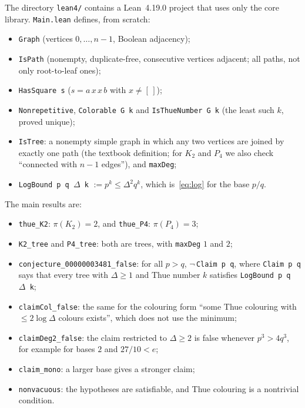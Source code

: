 \documentclass[11pt]{article}
\theoremstyle{definition}
\theoremstyle{remark}
\begin{document}
The directory \texttt{lean4/} contains a Lean~4.19.0 project that uses only the core library.
\texttt{Main.lean} defines, from scratch:
\begin{itemize}
\item \texttt{Graph} (vertices $0,\dots,n-1$, Boolean adjacency);
\item \texttt{IsPath} (nonempty, duplicate-free, consecutive vertices adjacent; all paths, not
only root-to-leaf ones);
\item \texttt{HasSquare s} ($s=a\,x\,x\,b$ with $x\ne[\,]$);
\item \texttt{Nonrepetitive}, \texttt{Colorable G k} and \texttt{IsThueNumber G k} (the least
such $k$, proved unique);
\item \texttt{IsTree}: a nonempty simple graph in which any two vertices are joined by exactly
one path (the textbook definition; for $K_2$ and $P_4$ we also check ``connected with $n-1$
edges''), and \texttt{maxDeg};
\item \texttt{LogBound p q $\Delta$ k} $:=p^k\le\Delta^2q^k$, which is~\eqref{eq:log} for the
base $p/q$.
\end{itemize}
The main results are:
\begin{itemize}
\item \texttt{thue\_K2}: $\pi(K_2)=2$, and \texttt{thue\_P4}: $\pi(P_4)=3$;
\item \texttt{K2\_tree} and \texttt{P4\_tree}: both are trees, with \texttt{maxDeg} $1$ and $2$;
\item \texttt{conjecture\_00000003481\_false}: for all $p>q$, $\neg$\,\texttt{Claim p q}, where
\texttt{Claim p q} says that every tree with $\Delta\ge1$ and Thue number $k$ satisfies
\texttt{LogBound p q $\Delta$ k};
\item \texttt{claimCol\_false}: the same for the colouring form ``some Thue colouring with
$\le2\log\Delta$ colours exists'', which does not use the minimum;
\item \texttt{claimDeg2\_false}: the claim restricted to $\Delta\ge2$ is false whenever
$p^3>4q^3$, for example for bases $2$ and $27/10<e$;
\item \texttt{claim\_mono}: a larger base gives a stronger claim;
\item \texttt{nonvacuous}: the hypotheses are satisfiable, and Thue colouring is a nontrivial
condition.
\end{itemize}
\end{document}
